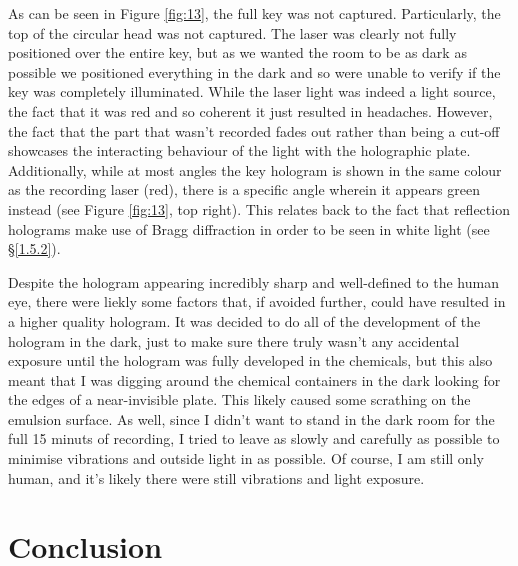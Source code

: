 \documentclass[12pt]{article}
\begin{document}
As can be seen in Figure \ref{fig:13}, the full key was not captured. Particularly, the top of the circular head was not captured. The laser was clearly not fully positioned over the entire key, but as we wanted the room to be as dark as
possible we positioned everything in the dark and so were unable to verify if the key was completely illuminated. While the laser light was indeed a light source, the fact that it was red and so coherent it just resulted in headaches.
However, the fact that the part that wasn't recorded fades out rather than being a cut-off showcases the interacting behaviour of the light with the holographic plate. Additionally, while at most angles the key hologram is shown in the same colour
as the recording laser (red), there is a specific angle wherein it appears green instead (see Figure \ref{fig:13}, top right). This relates back to the fact that reflection holograms make use of Bragg diffraction in order to be seen in white light (see §\ref{1.5.2}).

Despite the hologram appearing incredibly sharp and well-defined to the human eye, there were liekly some factors that, if avoided further, could have resulted in a higher quality hologram. It was decided to do all of the development of the hologram in the dark, just to make
sure there truly wasn't any accidental exposure until the hologram was fully developed in the chemicals, but this also meant that I was digging around the chemical containers in the dark looking for the edges of a near-invisible plate. This likely caused some scrathing on the emulsion surface.
As well, since I didn't want to stand in the dark room for the full 15 minuts of recording, I tried to leave as slowly and carefully as possible to minimise vibrations and outside light in as possible. Of course, I am still only human,
and it's likely there were still vibrations and light exposure. 

\section{Conclusion} \label{sec:4}



\newpage



 \label{sec:ref}

\vspace{1.5cm}

\listoffigures
\end{document}

